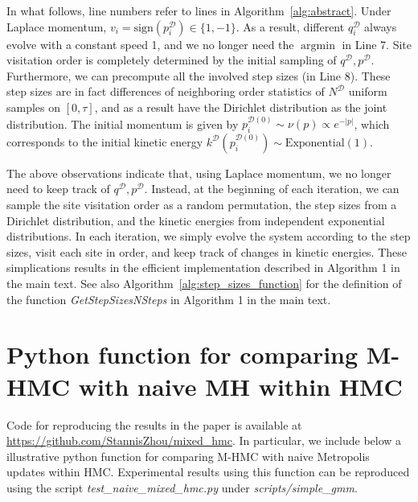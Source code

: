 \documentclass{article}
\newcommand{\cald}{\mathcal{D}}
\begin{document}
In what follows, line numbers refer to lines in Algorithm~\ref{alg:abstract}. Under Laplace momentum, $v_i=\text{sign}(p^\cald_i)\in\{1, -1\}$. As a result, different $q^\cald_i$ always evolve with a constant speed 1, and we no longer need the $\operatorname{argmin}$ in Line 7. Site visitation order is completely determined by the initial sampling of $q^\cald, p^\cald$. Furthermore, we can precompute all the involved step sizes (in Line 8). These step sizes are in fact differences of neighboring order statistics of $N^\cald$ uniform samples on $[0, \tau]$, and as a result have the Dirichlet distribution as the joint distribution. The initial momentum is given by $p^{\cald(0)}_i\sim \nu(p)\propto e^{-|p|}$, which corresponds to the initial kinetic energy $k^\cald(p^{\cald(0)}_i)\sim\text{Exponential}(1)$.

The above observations indicate that, using Laplace momentum, we no longer need to keep track of $q^\cald, p^\cald$. Instead, at the beginning of each iteration, we can sample the site visitation order as a random permutation, the step sizes from a Dirichlet distribution, and the kinetic energies from independent exponential distributions. In each iteration, we simply evolve the system according to the step sizes, visit each site in order, and keep track of changes in kinetic energies. These simplications results in the efficient implementation described in Algorithm 1 in the main text. See also Algorithm~\ref{alg:step_sizes_function} for the definition of the function \textit{GetStepSizesNSteps} in Algorithm 1 in the main text.


\section{Python function for comparing M-HMC with naive MH within HMC}
Code for reproducing the results in the paper is available at \url{https://github.com/StannisZhou/mixed_hmc}. In particular, we include below a illustrative python function for comparing M-HMC with naive Metropolis updates within HMC. Experimental results using this function can be reproduced using the script \textit{test\_naive\_mixed\_hmc.py} under \textit{scripts/simple\_gmm}.
\end{document}
